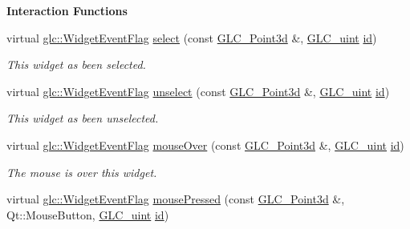 \begin{Indent}{\bf Interaction Functions}\par
\begin{DoxyCompactItemize}
\item 
virtual \hyperlink{namespaceglc_a7a4a1e3955352aeb2d018746fbe626d5}{glc\-::\-Widget\-Event\-Flag} \hyperlink{class_g_l_c__3_d_widget_abd8ec691f376bc8821c34741481cb564}{select} (const \hyperlink{glc__vector3d_8h_a4e13a9bbc7ab3d34de7e98b41836772c}{G\-L\-C\-\_\-\-Point3d} \&, \hyperlink{glc__global_8h_abf950976fabed69026558df8e2da6c6b}{G\-L\-C\-\_\-uint} \hyperlink{glext_8h_a58c2a664503e14ffb8f21012aabff3e9}{id})
\begin{DoxyCompactList}\small\item\em This widget as been selected. \end{DoxyCompactList}\item 
virtual \hyperlink{namespaceglc_a7a4a1e3955352aeb2d018746fbe626d5}{glc\-::\-Widget\-Event\-Flag} \hyperlink{class_g_l_c__3_d_widget_ae15c01776e9e985520e9c72205fbccc7}{unselect} (const \hyperlink{glc__vector3d_8h_a4e13a9bbc7ab3d34de7e98b41836772c}{G\-L\-C\-\_\-\-Point3d} \&, \hyperlink{glc__global_8h_abf950976fabed69026558df8e2da6c6b}{G\-L\-C\-\_\-uint} \hyperlink{glext_8h_a58c2a664503e14ffb8f21012aabff3e9}{id})
\begin{DoxyCompactList}\small\item\em This widget as been unselected. \end{DoxyCompactList}\item 
virtual \hyperlink{namespaceglc_a7a4a1e3955352aeb2d018746fbe626d5}{glc\-::\-Widget\-Event\-Flag} \hyperlink{class_g_l_c__3_d_widget_a9b91db37d0b73926a549e3ec05d88764}{mouse\-Over} (const \hyperlink{glc__vector3d_8h_a4e13a9bbc7ab3d34de7e98b41836772c}{G\-L\-C\-\_\-\-Point3d} \&, \hyperlink{glc__global_8h_abf950976fabed69026558df8e2da6c6b}{G\-L\-C\-\_\-uint} \hyperlink{glext_8h_a58c2a664503e14ffb8f21012aabff3e9}{id})
\begin{DoxyCompactList}\small\item\em The mouse is over this widget. \end{DoxyCompactList}\item 
virtual \hyperlink{namespaceglc_a7a4a1e3955352aeb2d018746fbe626d5}{glc\-::\-Widget\-Event\-Flag} \hyperlink{class_g_l_c__3_d_widget_ae6e20612066524b12073278eda6657ac}{mouse\-Pressed} (const \hyperlink{glc__vector3d_8h_a4e13a9bbc7ab3d34de7e98b41836772c}{G\-L\-C\-\_\-\-Point3d} \&, Qt\-::\-Mouse\-Button, \hyperlink{glc__global_8h_abf950976fabed69026558df8e2da6c6b}{G\-L\-C\-\_\-uint} \hyperlink{glext_8h_a58c2a664503e14ffb8f21012aabff3e9}{id})

\end{DoxyCompactItemize}
\end{Indent}
